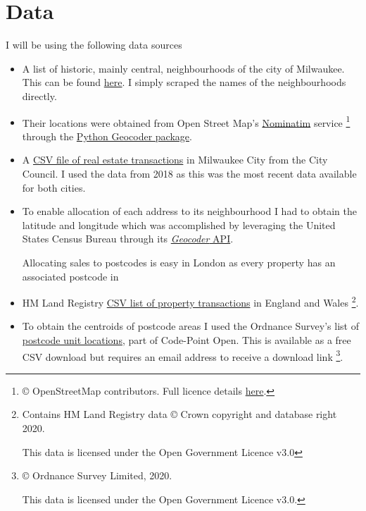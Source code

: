 \documentclass[a4paper,12pt,final,UKenglish]{article}
\begin{document}
    \section{Data}
        I will be using the following data sources
        \begin{itemize}
            \item A list of historic, mainly central, neighbourhoods of the city of Milwaukee.
            This can be found \href{https://guides.library.uwm.edu/c.php?g=56373\&p=362687}{here}.
            I simply scraped the names of the neighbourhoods directly.
            
            \item Their locations were obtained from Open Street Map's \href{https://nominatim.org/}{Nominatim} service%
            \footnote{© OpenStreetMap contributors.  Full licence details \href{https://www.openstreetmap.org/copyright}{here}.}
            through the \href{https://pypi.org/project/geocoder/}{Python Geocoder package}.            
            \item A \href{https://guides.library.uwm.edu/c.php?g=56373&p=362687}{CSV file of real estate transactions} in Milwaukee City from the City Council.
            I used the data from 2018 as this was the most recent data available for both cities.
            
            \item To enable allocation of each address to its neighbourhood I had to obtain the latitude and longitude which was accomplished by leveraging
            the United States Census Bureau through its \href{https://geocoding.geo.census.gov/geocoder/}{\textit{Geocoder} API}.
            
            Allocating sales to postcodes is easy in London as every property has an associated postcode in 
            \item HM Land Registry \href{prod.publicdata.landregistry.gov.uk.s3-website-eu-west-1.amazonaws.com/pp-2018.csv}{CSV list of property transactions} in England and Wales%
            \footnote{Contains HM Land Registry data © Crown copyright and database right 2020.\par
            \phantom{\ $^8$}This data is licensed under the Open Government Licence v3.0}.
           
            \item To obtain the centroids of postcode areas I used the Ordnance Survey’s list of
            \href{https://www.ordnancesurvey.co.uk/opendatadownload/products.html#CODEPO}{postcode unit locations}, part of Code-Point Open.
            This is available as a free CSV download but requires an email address to receive a download link%
            \footnote{© Ordnance Survey Limited, 2020.\par
            \phantom{\ $^8$}This data is licensed under the Open Government Licence v3.0.}.
            

\end{itemize}
\end{document}
